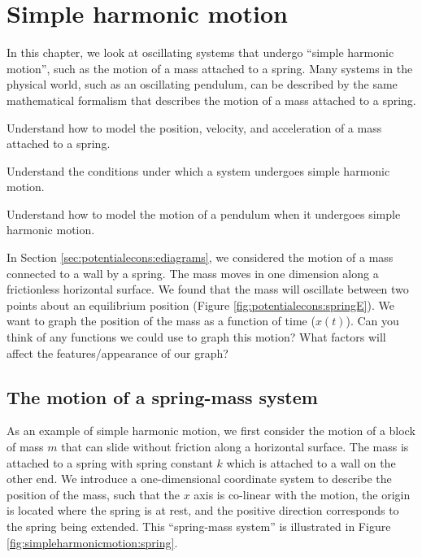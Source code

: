 
\chapter{Simple harmonic motion}
\label{chapter:simpleharmonicmotion}
In this chapter, we look at oscillating systems that undergo ``simple harmonic motion'', such as the motion of a mass attached to a spring. Many systems in the physical world, such as an oscillating pendulum, can be described by the same mathematical formalism that describes the motion of a mass attached to a spring. 

\begin{learningObjectives}{
 \item Understand how to model the position, velocity, and acceleration of a mass attached to a spring.
 \item Understand the conditions under which a system undergoes simple harmonic motion.
 \item Understand how to model the motion of a pendulum when it undergoes simple harmonic motion.
 }
\end{learningObjectives}

\begin{opening}
In Section \ref{sec:potentialecons:ediagrams}, we considered the motion of a mass connected to a wall by a spring. The mass moves in one dimension along a frictionless horizontal surface. We found that the mass will oscillate between two points about an equilibrium position (Figure \ref{fig:potentialecons:springE}). We want to graph the position of the mass as a function of time ($x(t)$). Can you think of any functions we could use to graph this motion? What factors will affect the features/appearance of our graph?
\end{opening}

\section{The motion of a spring-mass system}
As an example of simple harmonic motion, we first consider the motion of a block of mass $m$ that can slide without friction along a horizontal surface. The mass is attached to a spring with spring constant $k$ which is attached to a wall on the other end. We introduce a one-dimensional coordinate system to describe the position of the mass, such that the $x$ axis is co-linear with the motion, the origin is located where the spring is at rest, and the positive direction corresponds to the spring being extended. This ``spring-mass system'' is illustrated in Figure \ref{fig:simpleharmonicmotion:spring}.

